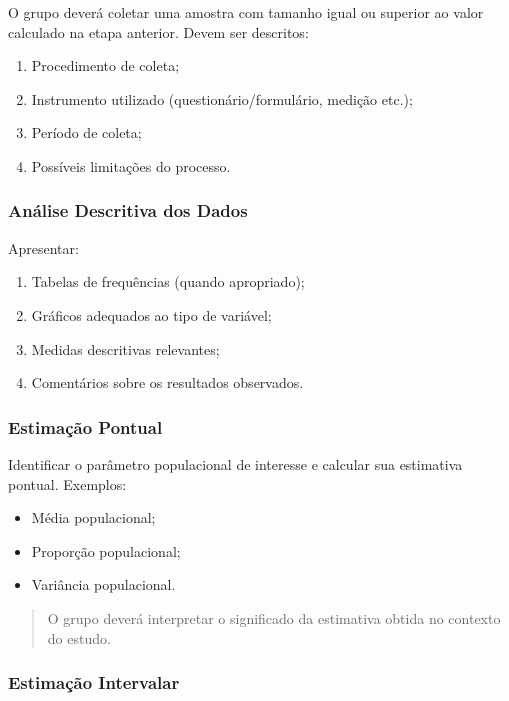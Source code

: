 \documentclass[
  letterpaper,
  DIV=11,
  numbers=noendperiod]{scrreprt}
\providecommand{\tightlist}{%
  \setlength{\itemsep}{0pt}\setlength{\parskip}{0pt}}\usepackage{longtable,booktabs,array}
\begin{document}
O grupo deverá coletar uma amostra com tamanho igual ou superior ao
valor calculado na etapa anterior. Devem ser descritos:

\begin{enumerate}
\def\labelenumi{\arabic{enumi}.}
\tightlist
\item
  Procedimento de coleta;
\item
  Instrumento utilizado (questionário/formulário, medição etc.);
\item
  Período de coleta;
\item
  Possíveis limitações do processo.
\end{enumerate}

\subsubsection{Análise Descritiva dos
Dados}\label{anuxe1lise-descritiva-dos-dados}

Apresentar:

\begin{enumerate}
\def\labelenumi{\arabic{enumi}.}
\tightlist
\item
  Tabelas de frequências (quando apropriado);
\item
  Gráficos adequados ao tipo de variável;
\item
  Medidas descritivas relevantes;
\item
  Comentários sobre os resultados observados.
\end{enumerate}

\subsubsection{Estimação Pontual}\label{estimauxe7uxe3o-pontual}

Identificar o parâmetro populacional de interesse e calcular sua
estimativa pontual. Exemplos:

\begin{itemize}
\tightlist
\item
  Média populacional;
\item
  Proporção populacional;
\item
  Variância populacional.
\end{itemize}

\begin{quote}
O grupo deverá interpretar o significado da estimativa obtida no
contexto do estudo.
\end{quote}

\subsubsection{Estimação Intervalar}\label{estimauxe7uxe3o-intervalar-1}
\end{document}
